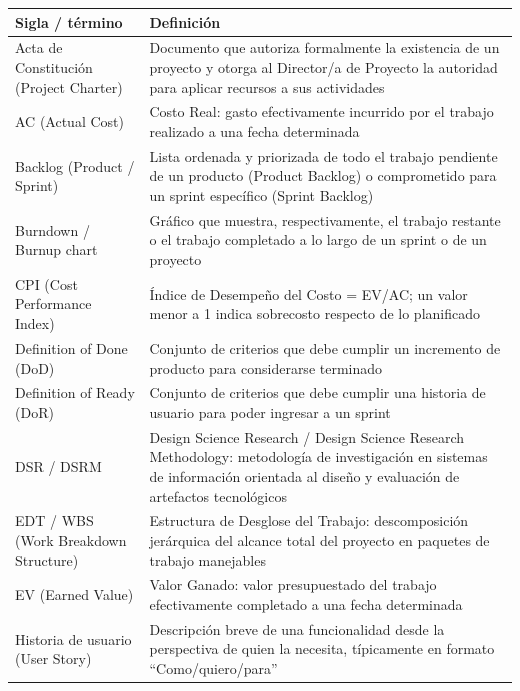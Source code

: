 \documentclass[11pt,a4paper]{article}
\begin{document}
{\small
\begin{longtable}[]{@{}
  >{\raggedright\arraybackslash}p{}
  >{\raggedright\arraybackslash}p{}@{}}
\toprule\noalign{}
\begin{minipage}[b]{\linewidth}\raggedright
Sigla / término
\end{minipage} & \begin{minipage}[b]{\linewidth}\raggedright
Definición
\end{minipage} \\
\midrule\noalign{}
\endhead
\bottomrule\noalign{}
\endlastfoot
Acta de Constitución (Project Charter) & Documento que autoriza formalmente la existencia de un proyecto y otorga al Director/a de Proyecto la autoridad para aplicar recursos a sus actividades \\
AC (Actual Cost) & Costo Real: gasto efectivamente incurrido por el trabajo realizado a una fecha determinada \\
Backlog (Product / Sprint) & Lista ordenada y priorizada de todo el trabajo pendiente de un producto (Product Backlog) o comprometido para un sprint específico (Sprint Backlog) \\
Burndown / Burnup chart & Gráfico que muestra, respectivamente, el trabajo restante o el trabajo completado a lo largo de un sprint o de un proyecto \\
CPI (Cost Performance Index) & Índice de Desempeño del Costo = EV/AC; un valor menor a 1 indica sobrecosto respecto de lo planificado \\
Definition of Done (DoD) & Conjunto de criterios que debe cumplir un incremento de producto para considerarse terminado \\
Definition of Ready (DoR) & Conjunto de criterios que debe cumplir una historia de usuario para poder ingresar a un sprint \\
DSR / DSRM & Design Science Research / Design Science Research Methodology: metodología de investigación en sistemas de información orientada al diseño y evaluación de artefactos tecnológicos \\
EDT / WBS (Work Breakdown Structure) & Estructura de Desglose del Trabajo: descomposición jerárquica del alcance total del proyecto en paquetes de trabajo manejables \\
EV (Earned Value) & Valor Ganado: valor presupuestado del trabajo efectivamente completado a una fecha determinada \\
Historia de usuario (User Story) & Descripción breve de una funcionalidad desde la perspectiva de quien la necesita, típicamente en formato ``Como/quiero/para'' \\

\end{longtable}}
\end{document}

